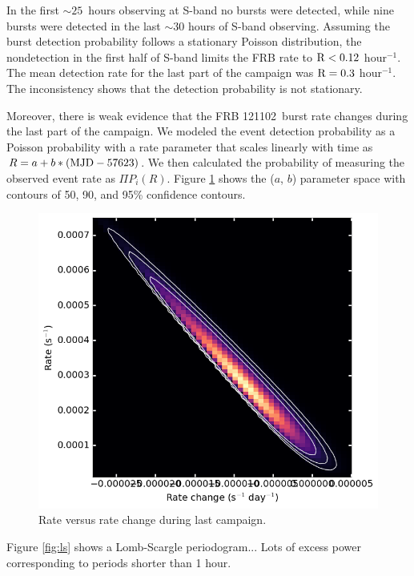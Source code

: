 \documentclass{emulateapj}
\newcommand{\frb}{FRB 121102}
\begin{document}
In the first $\sim25$\ hours observing at S-band no bursts were detected, while nine bursts were detected in the last $\sim30$ hours of S-band observing. Assuming the burst detection probability follows a stationary Poisson distribution, the nondetection in the first half of S-band limits the FRB rate to $\rm{R}<0.12$ hour$^{-1}$. The mean detection rate for the last part of the campaign was $\rm{R}=0.3$ hour$^{-1}$. The inconsistency shows that the detection probability is not stationary.

Moreover, there is weak evidence that the \frb\ burst rate changes during the last part of the campaign. We modeled the event detection probability as a Poisson probability with a rate parameter that scales linearly with time as $R=a + b*(\rm{MJD} - 57623)$. We then calculated the probability of measuring the observed event rate as $\Pi P_i(R)$. Figure \ref{fig:rate} shows the ($a$, $b$) parameter space with contours of 50, 90, and 95\% confidence contours. 

\begin{figure}[htb]
\begin{center}
\includegraphics[width=0.9\columnwidth]{event_rate_contours}
\caption{Rate versus rate change during last campaign.
\label{fig:rate}}
\end{center}
\end{figure}

Figure \ref{fig:ls} shows a Lomb-Scargle periodogram...
Lots of excess power corresponding to periods shorter than 1 hour.
\end{document}
